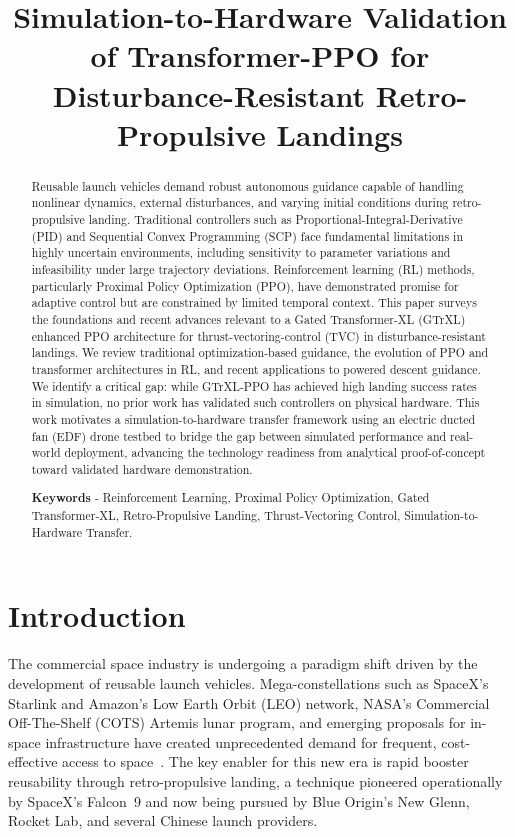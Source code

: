 \documentclass[10pt,twocolumn]{article}
\title{Simulation-to-Hardware Validation of Transformer-PPO for Disturbance-Resistant Retro-Propulsive Landings}
\author{}
\date{}
\begin{document}
\maketitle

\begin{abstract}
Reusable launch vehicles demand robust autonomous guidance capable of handling nonlinear dynamics, external disturbances, and varying initial conditions during retro-propulsive landing.
Traditional controllers such as Proportional-Integral-Derivative (PID) and Sequential Convex Programming (SCP) face fundamental limitations in highly uncertain environments, including sensitivity to parameter variations and infeasibility under large trajectory deviations.
Reinforcement learning (RL) methods, particularly Proximal Policy Optimization (PPO), have demonstrated promise for adaptive control but are constrained by limited temporal context.
This paper surveys the foundations and recent advances relevant to a Gated Transformer-XL (GTrXL) enhanced PPO architecture for thrust-vectoring-control (TVC) in disturbance-resistant landings.
We review traditional optimization-based guidance, the evolution of PPO and transformer architectures in RL, and recent applications to powered descent guidance.
We identify a critical gap: while GTrXL-PPO has achieved high landing success rates in simulation, no prior work has validated such controllers on physical hardware.
This work motivates a simulation-to-hardware transfer framework using an electric ducted fan (EDF) drone testbed to bridge the gap between simulated performance and real-world deployment, advancing the technology readiness from analytical proof-of-concept toward validated hardware demonstration.

\textbf{Keywords} - Reinforcement Learning, Proximal Policy Optimization, Gated Transformer-XL, Retro-Propulsive Landing, Thrust-Vectoring Control, Simulation-to-Hardware Transfer.
\end{abstract}

\section{Introduction}

The commercial space industry is undergoing a paradigm shift driven by the development of reusable launch vehicles.
Mega-constellations such as SpaceX's Starlink and Amazon's Low Earth Orbit (LEO) network, NASA's Commercial Off-The-Shelf (COTS) Artemis lunar program, and emerging proposals for in-space infrastructure have created unprecedented demand for frequent, cost-effective access to space~\cite{bushnell2018}.
The key enabler for this new era is rapid booster reusability through retro-propulsive landing, a technique pioneered operationally by SpaceX's Falcon~9 and now being pursued by Blue Origin's New Glenn, Rocket Lab, and several Chinese launch providers.
\end{document}
